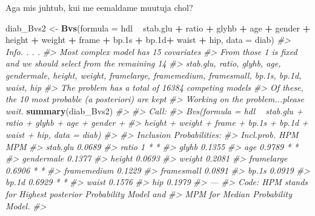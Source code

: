 \documentclass[]{book}
\newenvironment{Shaded}{\begin{snugshade}}{\end{snugshade}}
\newcommand{\KeywordTok}[1]{\textcolor[rgb]{0.13,0.29,0.53}{\textbf{#1}}}
\newcommand{\DataTypeTok}[1]{\textcolor[rgb]{0.13,0.29,0.53}{#1}}
\newcommand{\StringTok}[1]{\textcolor[rgb]{0.31,0.60,0.02}{#1}}
\newcommand{\CommentTok}[1]{\textcolor[rgb]{0.56,0.35,0.01}{\textit{#1}}}
\newcommand{\OperatorTok}[1]{\textcolor[rgb]{0.81,0.36,0.00}{\textbf{#1}}}
\newcommand{\NormalTok}[1]{#1}
\begin{document}
Aga mis juhtub, kui me eemaldame muutuja chol?

\begin{Shaded}
\begin{Highlighting}[]
\NormalTok{diab_Bvs2 <-}\StringTok{ }\KeywordTok{Bvs}\NormalTok{(}\DataTypeTok{formula =}\NormalTok{ hdl }\OperatorTok{~}\StringTok{ }\NormalTok{stab.glu }\OperatorTok{+}\StringTok{ }\NormalTok{ratio }\OperatorTok{+}\StringTok{ }\NormalTok{glyhb }\OperatorTok{+}\StringTok{ }\NormalTok{age }\OperatorTok{+}\StringTok{ }\NormalTok{gender }\OperatorTok{+}\StringTok{ }\NormalTok{height }\OperatorTok{+}\StringTok{ }\NormalTok{weight }\OperatorTok{+}\StringTok{ }\NormalTok{frame }\OperatorTok{+}\StringTok{ }\NormalTok{bp.1s }\OperatorTok{+}\StringTok{ }\NormalTok{bp.1d}\OperatorTok{+}\StringTok{ }\NormalTok{waist }\OperatorTok{+}\StringTok{ }\NormalTok{hip, }\DataTypeTok{data =}\NormalTok{ diab)}
\CommentTok{#> Info. . . .}
\CommentTok{#> Most complex model has 15 covariates}
\CommentTok{#> From those 1 is fixed and we should select from the remaining 14 }
\CommentTok{#> stab.glu, ratio, glyhb, age, gendermale, height, weight, framelarge, framemedium, framesmall, bp.1s, bp.1d, waist, hip}
\CommentTok{#> The problem has a total of 16384 competing models}
\CommentTok{#> Of these, the  10 most probable (a posteriori) are kept}
\CommentTok{#> Working on the problem...please wait.}
\KeywordTok{summary}\NormalTok{(diab_Bvs2)}
\CommentTok{#> }
\CommentTok{#> Call:}
\CommentTok{#> Bvs(formula = hdl ~ stab.glu + ratio + glyhb + age + gender + }
\CommentTok{#>     height + weight + frame + bp.1s + bp.1d + waist + hip, data = diab)}
\CommentTok{#> }
\CommentTok{#> Inclusion Probabilities:}
\CommentTok{#>             Incl.prob. HPM MPM}
\CommentTok{#> stab.glu        0.0689        }
\CommentTok{#> ratio                1   *   *}
\CommentTok{#> glyhb           0.1355        }
\CommentTok{#> age             0.9789   *   *}
\CommentTok{#> gendermale      0.1377        }
\CommentTok{#> height          0.0693        }
\CommentTok{#> weight          0.2081        }
\CommentTok{#> framelarge      0.6906   *   *}
\CommentTok{#> framemedium     0.1229        }
\CommentTok{#> framesmall      0.0891        }
\CommentTok{#> bp.1s           0.0919        }
\CommentTok{#> bp.1d           0.6929   *   *}
\CommentTok{#> waist           0.1576        }
\CommentTok{#> hip             0.1979        }
\CommentTok{#> ---}
\CommentTok{#> Code: HPM stands for Highest posterior Probability Model and}
\CommentTok{#>  MPM for Median Probability Model.}
\CommentTok{#> }
\end{Highlighting}
\end{Shaded}
\end{document}
